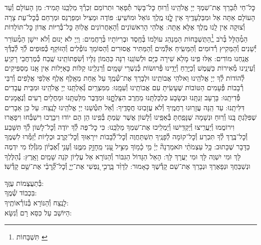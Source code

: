 \documentclass[twoside, openany, parskip=half, 11pt]{book}
\begin{document}
\label{nishmas}
כׇּל־חַי תְּ֯בָרֵךְ אֶת־שִׁמְךָ יְיָ אֱלֹהֵֽינוּ וְ֯רֽוּחַ כׇּל־בָּשָׂר תְּ֯פָאֵר וּתְרוֹמֵם זִכְרְ֯ךָ מַלְכֵּֽנוּ תָּמִיד: מִן הָעוֹלָם וְ֯עַד הָעוֹלָם אַתָּה אֵל וּמִבַּלְעָדֶֽיךָ אֵין לׇׇׇׇֽנּוּ מֶֽלֶךְ גּוֹאֵל וּמוֹשִֽׁיעַ:
פּוֹדֶה וּמַצִיל וּמְפַרְנֵס וּמְרַחֵם בְּ֯כׇל־עֵת צָרָה וְ֯צוּקָה אֵין לָֽנוּ מֶֽלֶךְ אֶלָּא אַֽתָּה: אֱלֹהֵי הָרִאשׁוֹנִים וְ֯הָאַחֲרוֹנִים אֱלֽוֹהַּ כׇּל־בְּ֯רִיּוֹת אֲדוֹן כׇּל־תּוֹלָדוֹת הַמְ֯הֻלָּל בְּ֯רֹב \footnote{תִּשְׁבָּחוֹת \label{xx}}הַתֻּשְׁבָּחוֹת הַמְנַהֵג עוֹלָמוֹ בְּ֯חֶֽסֶד וּבְרִיּוֹתָיו בְּ֯רַחֲמִים: וַיְיָ לֹא יָנוּם וְ֯לֹא יִישָׁן הַמְ֯עוֹרֵר יְ֯שֵׁנִים וְ֯הַמֵּקִיץ רְ֯דוּמִים וְ֯הַמֵּשִֽׂיחַ אִלְּ֯מִים וְ֯הַמַּתִּיר אֲסוּרִים וְ֯הַסּוֹמֵךְ נוֹפְ֯לִים וְ֯הַזּוֹקֵף כְּ֯פוּפִים לְ֯ךָ לְ֯בַדְּ֯ךָ אֲנַֽחְנוּ מוֹדִים: אִֽלּוּ פִֽינוּ מָלֵא שִׁירָה כַּיָּם וּלְשׁוֹנֵֽנוּ רִנָּה כַּהֲמוֹן גַּלָּיו וְ֯שִׂפְתוֹתֵֽינוּ שֶֽׁבַח כְּ֯מֶרְחֲבֵי רָקִֽיעַ וְ֯עֵינֵֽינוּ מְ֯אִירוֹת כַּשֶּֽׁמֶשׁ וְ֯כַיָּרֵֽחַ וְ֯יָדֵֽינוּ פְּ֯רוּשׂוֹת כְּ֯נִשְׁרֵי שָּׁמָֽיִם וְ֯רַגְלֵֽינוּ קַלּוֹת כָּאַיָּלוֹת אֵין אָֽנוּ מַסְפִּיקִים לְ֯הוֹדוֹת לְ֯ךָ יְיָ אֱלֹהֵֽינוּ וֵאלֹהֵי אֲבוֹתֵֽינוּ וּלְבָרֵךְ אֶת־שְׁ֯מֶֽךָ עַל אַֽחַת מֵאָֽלֶף אֶֽלֶף אַלְפֵי אֲלָפִים וְ֯רִבֵּי רְ֯בָבוֹת פְּ֯עָמִים הַטּוֹבוֹת שֶׁעָשִֽׂיתָ עִם אֲבוֹתֵֽינוּ וְ֯עִמָּֽנוּ: מִמִּצְרַֽיִם גְּ֯אַלְתָּֽנוּ יְיָ אֱלֹהֵֽינוּ וּמִבֵּית עֲבָדִים פְּ֯דִיתָֽנוּ: בָּרָעָב זַנְתָּֽנוּ וּבְשָׂבָע כִּלְכַּלְתָּֽנוּ מֵחֶֽרֶב הִצַּלְתׇׇׇׇּֽנּוּ וּמִדֶּֽבֶר מִלַּטְתָּֽנוּ וּמֵחֳלָיִם רָעִים וְ֯נֶאֱמָנִים דִּלִּיתָֽנוּ: עַד הֵֽנָּה עֲזָרֽוּנוּ רַחֲמֶֽיךָ וְ֯לֹא עֲזָבֽוּנוּ חֲסָדֶֽיךָ: וְ֯אַל תִּטְּ֯שֵׁנוּ יְיָ אֱלֹהֵֽינוּ לָנֶֽצַח: עַל כֵּן אֵבָרִים שֶׁפִּלַּגְתָּ בָּֽנוּ וְ֯רֽוּחַ וּנְשָׁמָה שֶׁנָּפַֽחְתָּ בְּ֯אַפֵּֽינוּ וְ֯לָשׁוֹן אֲשֶׁר שַֽׂמְתָּ בְּ֯פִֽינוּ הֵן הֵם יוֹדוּ וִיבָרֲכוּ וִישַׁבְּ֯חוּ וִיפָאֲרוּ וִירוֹמֲמוּ וְ֯יַעֲרִֽיצוּ וְ֯יַקְדִּֽישׁוּ וְ֯יַמְלִֽיכוּ אֶת־שִׁמְךָ מַלְכֵּֽנוּ: כִּי כׇל־פֶּה לְ֯ךָ יוֹדֶה וְ֯כׇל־לָשׁוֹן לְ֯ךָ תִּשָּׁבַע וְ֯כׇל־בֶּֽרֶךְ לְ֯ךָ תִּכְרַע וְ֯כׇל־קוֹמָה לְ֯פָנֶֽיךָ תִשְׁתַּחֲוֶה וְ֯כׇל־לְ֯בָבוֹת יִירָאֽוּךָ וְ֯כׇל־קֶֽרֶב וּכְלָיוֹת יְ֯זַמְּ֯רוּ לִשְׁמֶֽךָ כַּדָּבָר שֶׁכָּתוּב:
כָּ֥ל עַצְמֹתַ֨י תֹּאמַרְנָה֘ יְיָ֗ מִ֤י כָ֫מ֥וֹךָ מַצִּ֣יל עָ֭נִי מֵֽחָזָ֣ק מִמֶּ֑נּוּ וְ֯עָנִ֥י וְ֝֯אֶבְי֗וֹן מִגֹּֽזְ֯לֽוֹ׃ מִי יִדְמֶה לָּךְ וּמִי יִשְׁוֶה לָּךְ וּמִי יַעֲרָךְ לָּךְ: הָאֵל הַגָּדוֹל הַגִּבּוֹר וְ֯הַנּוֹרָא אֵל עֶלְיוֹן קֹנֵה שָׁמַֽיִם וָאָֽרֶץ:
נְ֯הַלֶּלְךָ וּנְשַׁבֵּחֲךָ וּנְפָאֶרְךָ וּנְבָרֵךְ אֶת־שֵׁם קָדְ֯שֶׁךָ כָּאָמוּר:
לְדָוִ֨ד בָּֽרֲכִ֣י נַ֭פְשִׁי אֶת־יְיָ֑ וְ֯כׇל־קְ֝֯רָבַ֗י אֶת־שֵׁ֥ם קָדְ֯שֽׁוֹ׃


בְּ֯תַעֲצֻמוֹת עֻזֶּֽךָ:\\
בִּכְבוֹד שְׁ֯מֶֽךָ:\\
לָנֶֽצַח וְ֯הַנּוֹרָא בְּ֯נוֹרְ֯אוֹתֶֽיךָ:\\
הַיּוֹשֵׁב עַל כִּסֵּא רָם וְ֯נִשָּׂא:
\end{document}

